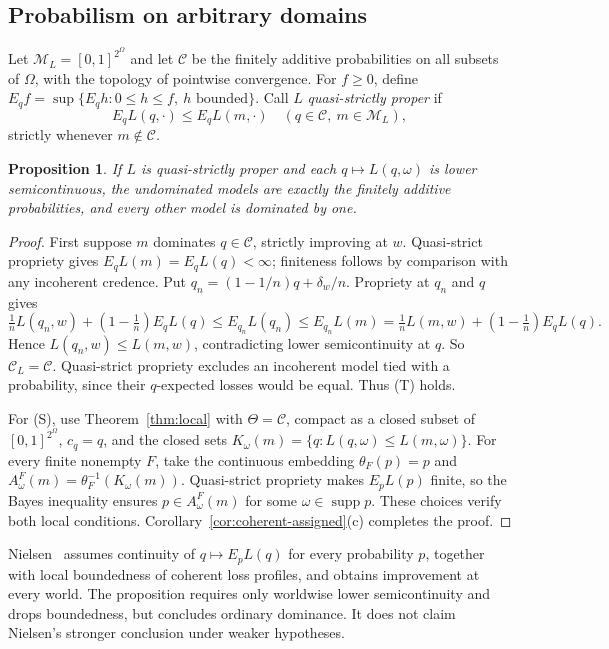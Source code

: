 \documentclass[11pt]{article}
\newtheorem{proposition}[theorem]{Proposition}
\theoremstyle{definition}
\newcommand{\M}{\mathcal M}
\newcommand{\C}{\mathcal C}
\newcommand{\supp}{\operatorname{supp}}
\begin{document}
\subsection{Probabilism on arbitrary domains}
Let $\M_L=[0,1]^{2^\Omega}$ and let $\C$ be the finitely additive probabilities on all subsets of $\Omega$, with the topology of pointwise convergence. For $f\ge0$, define $E_qf=\sup\{E_qh:0\le h\le f,\ h\text{ bounded}\}$. Call $L$ \emph{quasi-strictly proper} if
\[
E_qL(q,\cdot)\le E_qL(m,\cdot)\quad(q\in\C,\ m\in\M_L),
\]
strictly whenever $m\notin\C$.
\begin{proposition}\label{prop:short-infinite}
If $L$ is quasi-strictly proper and each $q\mapsto L(q,\omega)$ is lower semicontinuous, the undominated models are exactly the finitely additive probabilities, and every other model is dominated by one.
\end{proposition}
\begin{proof}
First suppose $m$ dominates $q\in\C$, strictly improving at $w$. Quasi-strict propriety gives $E_qL(m)=E_qL(q)<\infty$; finiteness follows by comparison with any incoherent credence. Put $q_n=(1-1/n)q+\delta_w/n$. Propriety at $q_n$ and $q$ gives
\[
\tfrac1nL(q_n,w)+(1-\tfrac1n)E_qL(q)
\le E_{q_n}L(q_n)\le E_{q_n}L(m)
=\tfrac1nL(m,w)+(1-\tfrac1n)E_qL(q).
\]
Hence $L(q_n,w)\le L(m,w)$, contradicting lower semicontinuity at $q$. So $\C_L=\C$. Quasi-strict propriety excludes an incoherent model tied with a probability, since their $q$-expected losses would be equal. Thus (T) holds.

For (S), use Theorem~\ref{thm:local} with $\Theta=\C$, compact as a closed subset of $[0,1]^{2^\Omega}$, $c_q=q$, and the closed sets $K_\omega(m)=\{q:L(q,\omega)\le L(m,\omega)\}$. For every finite nonempty $F$, take the continuous embedding $\theta_F(p)=p$ and $A^F_\omega(m)=\theta_F^{-1}(K_\omega(m))$. Quasi-strict propriety makes $E_pL(p)$ finite, so the Bayes inequality ensures $p\in A^F_\omega(m)$ for some $\omega\in\supp p$. These choices verify both local conditions. Corollary~\ref{cor:coherent-assigned}(c) completes the proof.
\end{proof}
Nielsen~\cite{Nielsen2023} assumes continuity of $q\mapsto E_pL(q)$ for every probability $p$, together with local boundedness of coherent loss profiles, and obtains improvement at every world. The proposition requires only worldwise lower semicontinuity and drops boundedness, but concludes ordinary dominance. It does not claim Nielsen's stronger conclusion under weaker hypotheses.
\end{document}
